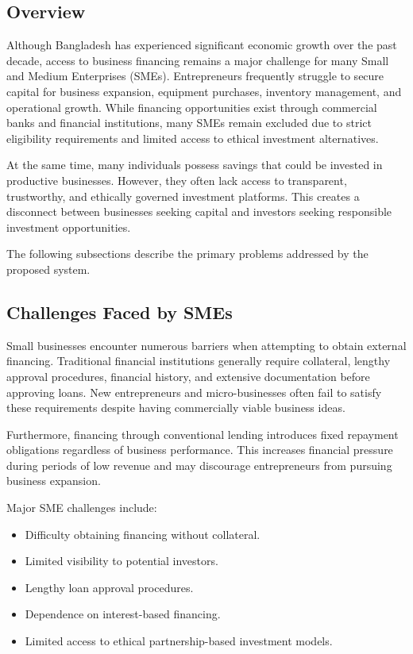 \subsection{Overview}

Although Bangladesh has experienced significant economic growth over the past decade, access to business financing remains a major challenge for many Small and Medium Enterprises (SMEs). Entrepreneurs frequently struggle to secure capital for business expansion, equipment purchases, inventory management, and operational growth. While financing opportunities exist through commercial banks and financial institutions, many SMEs remain excluded due to strict eligibility requirements and limited access to ethical investment alternatives.

At the same time, many individuals possess savings that could be invested in productive businesses. However, they often lack access to transparent, trustworthy, and ethically governed investment platforms. This creates a disconnect between businesses seeking capital and investors seeking responsible investment opportunities.

The following subsections describe the primary problems addressed by the proposed system.


\subsection{Challenges Faced by SMEs}

Small businesses encounter numerous barriers when attempting to obtain external financing. Traditional financial institutions generally require collateral, lengthy approval procedures, financial history, and extensive documentation before approving loans. New entrepreneurs and micro-businesses often fail to satisfy these requirements despite having commercially viable business ideas.

Furthermore, financing through conventional lending introduces fixed repayment obligations regardless of business performance. This increases financial pressure during periods of low revenue and may discourage entrepreneurs from pursuing business expansion.

Major SME challenges include:

\begin{itemize}
\item Difficulty obtaining financing without collateral.
\item Limited visibility to potential investors.
\item Lengthy loan approval procedures.
\item Dependence on interest-based financing.
\item Limited access to ethical partnership-based investment models.
\end{itemize}

